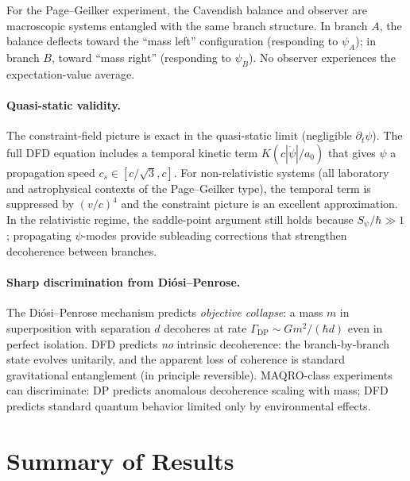\documentclass[11pt,a4paper]{article}
\begin{document}
\begin{tcolorbox}[colback=blue!5, colframe=blue!50!black,
title=Proposed Replacement Text for Section 14.1]
For the Page--Geilker experiment, the Cavendish balance and observer
are macroscopic systems entangled with the same branch structure. In
branch $A$, the balance deflects toward the ``mass left'' configuration
(responding to $\psi_A$); in branch $B$, toward ``mass right'' (responding
to $\psi_B$). No observer experiences the expectation-value average.

\paragraph{Quasi-static validity.}
The constraint-field picture is exact in the quasi-static limit
(negligible $\partial_t\psi$). The full DFD equation includes a temporal
kinetic term $K(c|\dot\psi|/a_0)$ that gives $\psi$ a propagation speed
$c_s \in [c/\sqrt{3}, c]$. For non-relativistic systems (all laboratory
and astrophysical contexts of the Page--Geilker type), the temporal term
is suppressed by $(v/c)^4$ and the constraint picture is an excellent
approximation. In the relativistic regime, the saddle-point argument
still holds because $S_\psi/\hbar \gg 1$; propagating $\psi$-modes
provide subleading corrections that strengthen decoherence between
branches.

\paragraph{Sharp discrimination from Di\'osi--Penrose.}
The Di\'osi--Penrose mechanism predicts \emph{objective collapse}:
a mass $m$ in superposition with separation $d$ decoheres at rate
$\Gamma_\mathrm{DP} \sim Gm^2/(\hbar d)$ even in perfect isolation.
DFD predicts \emph{no} intrinsic decoherence: the branch-by-branch
state evolves unitarily, and the apparent loss of coherence is standard
gravitational entanglement (in principle reversible). MAQRO-class
experiments can discriminate: DP predicts anomalous decoherence scaling
with mass; DFD predicts standard quantum behavior limited only by
environmental effects.
\end{tcolorbox}

\section{Summary of Results}
\label{sec:summary}
\end{document}
